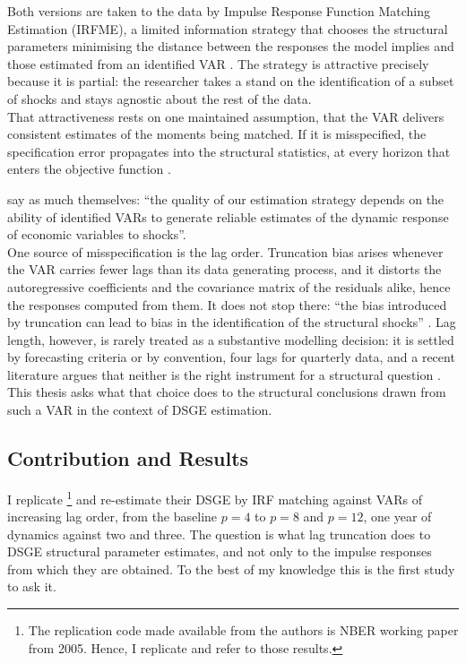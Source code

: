 \documentclass[12pt, a4paper]{article}
\begin{document}
Both versions are taken to the data by Impulse Response Function Matching Estimation (IRFME), a
limited information strategy that chooses the structural parameters minimising the distance between
the responses the model implies and those estimated from an identified VAR \citep{CEE2005, ACEL2011,
Hall_Inoue_Nason_Rossi2012}. The strategy is
attractive precisely because it is partial: the researcher takes a stand on the identification of a
subset of shocks and stays agnostic about the rest of the data.
\\

That attractiveness rests on one maintained assumption, that the VAR delivers consistent estimates
of the moments being matched. If it is misspecified, the specification error propagates into the
structural statistics, at every horizon that enters the objective function \citep{Ramey2016,
Canova_Fosso2025, Humble_VARs_2026}. 

\citet[p.~3, fn.~10]{ACEL2011} say as much themselves: ``the quality of our
estimation strategy depends on the ability of identified VARs to generate reliable estimates of the
dynamic response of economic variables to shocks''.
\\

One source of misspecification is the lag order. Truncation bias arises whenever the VAR carries
fewer lags than its data generating process, and it distorts the autoregressive coefficients and
the covariance matrix of the residuals alike, hence the responses computed from them. It does not
stop there: ``the bias introduced by truncation can lead to bias in the identification of the
structural shocks'' \citep[p.~2048]{Ravenna2007}. Lag length, however, is rarely treated as a
substantive modelling decision: it is settled by forecasting criteria or by convention, four lags
for quarterly data, and a recent literature argues that neither is the right instrument for a
structural question \citep{Long_Lag2025, Baumeister2025}. This thesis asks what that choice does to
the structural conclusions drawn from such a VAR in the context of DSGE estimation.

\subsection{Contribution and Results}

I replicate \citet{ACEL2005WP}\footnote{The replication code made available from the authors is NBER working paper from 2005. Hence, I replicate and refer to those results.} 
and re-estimate their DSGE by IRF matching against VARs of
increasing lag order, from the baseline $p = 4$ to $p = 8$ and $p = 12$, one year of dynamics
against two and three. The question is what lag truncation does to DSGE structural parameter estimates, 
and not only to the impulse responses from which they are obtained. To the best of my knowledge this is
the first study to ask it.
\\
\end{document}

